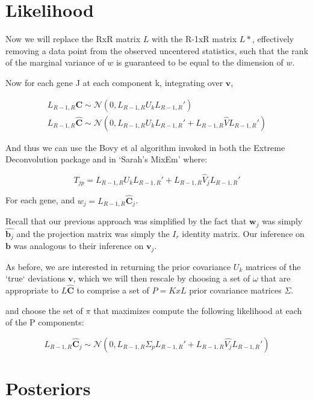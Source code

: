 \documentclass[11pt, oneside]{article}   	%
\newcommand{\Norm}{{\mathcal{N}}} %
\newcommand{\ceff}{\bm{C}}
\newcommand{\chat}{\bm{\hat{C}}}
\newcommand{\vb}{\bm{v}}
\begin{document}
\begin{itemize}
\section{Likelihood}

Now we will replace the RxR matrix $L$ with the R-1xR matrix $L*$, effectively removing a data point from the observed uncentered statistics, such that the rank of the marginal variance of $w$ is guaranteed to be equal to the dimension of $w$.

Now for each gene J at each component k, integrating over $\vb$, 


\begin{equation}
\begin{aligned}
\label{maxlike}
L_{R-1,R} \ceff \sim \Norm (0, L_{R-1,R} U_{k} L_{R-1,R} ') \\
L_{R-1,R} \chat \sim \Norm (0, L_{R-1,R}  U_{k} L_{R-1,R} ' + L_{R-1,R} \hat{V} L_{R-1,R} ') 
\end{aligned}
\end{equation}


And thus we can use the Bovy et al algorithm invoked in both the Extreme Deconvolution package and in `Sarah's MixEm' where:

\begin{equation}
 T_{jp} = L_{R-1,R} U_k L_{R-1,R}' + L_{R-1,R} \hat{V}_{j} L_{R-1,R}'
\end{equation}

For each gene, and $w_{j} = L_{R-1,R} \chat_{j}$.

Recall that our previous approach was simplified by the fact that $\bm{w}_{j}$ was simply $\hat{\bm{b}_{j}}$ and the projection matrix was simply the $I_{r}$ identity matrix. Our inference on $\bm{b}$ was analogous to their inference on $\vb_{j}$. 


As before, we are interested in returning the prior covariance $U_k$ matrices of the `true` deviations $\vb$, which we will then rescale by choosing a set of $\omega$ that are appropriate to $L \chat $ to comprise a set of $P = KxL$ prior covariance matrices $\Sigma$.

and choose the set of $\pi$ that maximizes compute the following likelihood at each of the P components: 

\begin{equation}
L_{R-1,R}  \chat _j \sim \Norm (0, L_{R-1,R}  \Sigma_{p} L_{R-1,R} ' + L_{R-1,R} \hat{V_j} L_{R-1,R} ') 
\end{equation}
 

\section{Posteriors}


\end{itemize}
\end{document}
